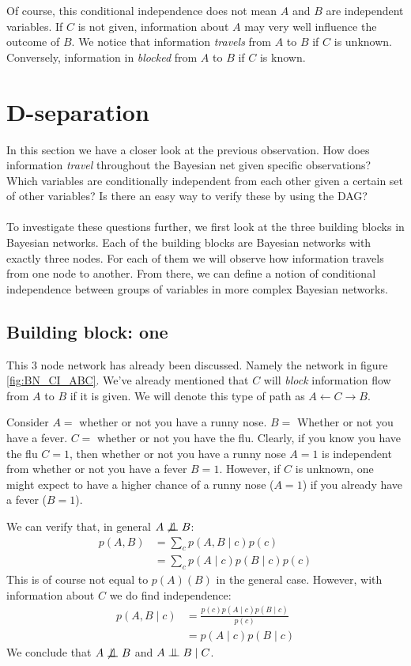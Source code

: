 \noindent
Of course, this conditional independence does not mean $A$ and $B$
are independent variables. If $C$ is not given, information about $A$
may very well influence the outcome of $B$. We notice that information
\textit{travels} from $A$ to $B$ if $C$ is unknown. Conversely, 
information in \textit{blocked} from $A$ to $B$ if $C$ is known.

\section{D-separation}
In this section we have a closer look at the previous observation.
How does information \textit{travel} throughout the Bayesian net
given specific observations? Which variables are conditionally 
independent from each other given a certain set of other variables?
Is there an easy way to verify these by using the DAG?
\\\\
To investigate these questions further, we first look at the 
three building blocks in Bayesian networks. Each of the building
blocks are Bayesian networks with exactly three nodes. For
each of them we will observe how information travels from one
node to another. From there, we can define a notion of conditional
independence between groups of variables in more complex Bayesian
networks.

\subsection{Building block: one}
This 3 node network has already been discussed. Namely the network 
in figure \ref{fig:BN_CI_ABC}. We've already mentioned that $C$
will \textit{block} information flow from $A$ to $B$ if it is given.
We will denote this type of path as $A \leftarrow C \rightarrow B$.
\begin{exmp}
Consider $A=$ whether or not you have a runny nose.
$B = $ Whether or not you have a fever. $C=$ whether or not you 
have the flu. Clearly, if you know you have the flu $C = 1$, then
whether or not you have a runny nose $A = 1$ is independent
from whether or not you have a fever $B = 1$. However, if $C$ is
unknown, one might expect to have a higher chance of a runny nose 
($A = 1$) if you already have a fever ($B = 1$).
\end{exmp}

\noindent
We can verify that, in general $A \not \CI B$:
\begin{equation}\begin{split}
p(A, B) 
	&= \sum_c p(A, B \mid c)p(c)\\
	&= \sum_c p(A \mid c)p(B \mid c)p(c)
\end{split}\end{equation}
This is of course not equal to $p(A)(B)$ in the general case. 
However, with information about $C$ we do find independence:
\begin{equation}\begin{split}
p(A, B \mid c) 
	&= \frac{p(c)p(A \mid c)p(B \mid c)}{p(c)} \\
	&= p(A \mid c) p(B \mid c)
\end{split}\end{equation}
We conclude that $A \not \CI B$ and $A \CI B \mid C$.
